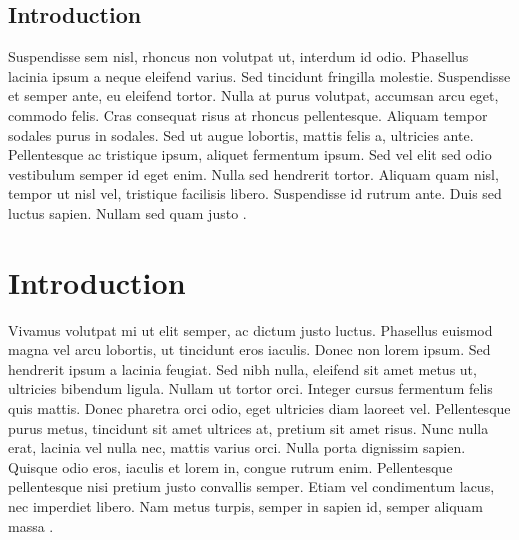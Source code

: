 \subsection{Introduction}
Suspendisse sem nisl, rhoncus non volutpat ut, interdum id odio. Phasellus
lacinia ipsum a neque eleifend varius. Sed tincidunt fringilla molestie.
Suspendisse et semper ante, eu eleifend tortor. Nulla at purus volutpat,
accumsan arcu eget, commodo felis. Cras consequat risus at rhoncus
pellentesque. Aliquam tempor sodales purus in sodales. Sed ut augue lobortis,
mattis felis a, ultricies ante. Pellentesque ac tristique ipsum, aliquet
fermentum ipsum. Sed vel elit sed odio vestibulum semper id eget enim. Nulla
sed hendrerit tortor. Aliquam quam nisl, tempor ut nisl vel, tristique
facilisis libero. Suspendisse id rutrum ante. Duis sed luctus sapien. Nullam
sed quam justo \cite{web:website}.

\section{Introduction}
Vivamus volutpat mi ut elit semper, ac dictum justo luctus. Phasellus euismod
magna vel arcu lobortis, ut tincidunt eros iaculis. Donec non lorem ipsum. Sed
hendrerit ipsum a lacinia feugiat. Sed nibh nulla, eleifend sit amet metus ut,
ultricies bibendum ligula. Nullam ut tortor orci. Integer cursus fermentum
felis quis mattis. Donec pharetra orci odio, eget ultricies diam laoreet vel.
Pellentesque purus metus, tincidunt sit amet ultrices at, pretium sit amet
risus. Nunc nulla erat, lacinia vel nulla nec, mattis varius orci. Nulla porta
dignissim sapien. Quisque odio eros, iaculis et lorem in, congue rutrum enim.
Pellentesque pellentesque nisi pretium justo convallis semper. Etiam vel
condimentum lacus, nec imperdiet libero. Nam metus turpis, semper in sapien id,
semper aliquam massa \cite{*}.
